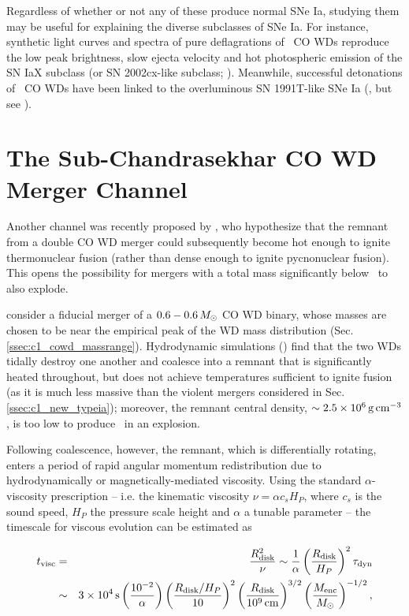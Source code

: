 Regardless of whether or not any of these produce normal SNe Ia, studying them may be useful for explaining the diverse subclasses of SNe Ia.  For instance, synthetic light curves and spectra of pure deflagrations of \Mch\ CO WDs \citep{phil+07, krom+13, fink+14} reproduce the low peak brightness, slow ejecta velocity and hot photospheric emission of the SN IaX subclass (or SN 2002cx-like subclass; \citealt{li+02, fole+13}).  Meanwhile, successful detonations of \Mch\ CO WDs have been linked to the overluminous SN 1991T-like SNe Ia (\citealt{fishj15}, but see \citealt{seit+16}).

\section{The Sub-Chandrasekhar CO WD Merger Channel}
\label{sec:c1_vkchannel}

Another channel was recently proposed by \citeal{vkercj10}, who hypothesize that the remnant from a double CO WD merger could subsequently become hot enough to ignite thermonuclear fusion (rather than dense enough to ignite pycnonuclear fusion).  This opens the possibility for mergers with a total mass significantly below \Mch\ to also explode.

\citeal{vkercj10} consider a fiducial merger of a $0.6-0.6\,\Msun$ CO WD binary, whose masses are chosen to be near the empirical peak of the WD mass distribution (Sec. \ref{ssec:c1_cowd_massrange}).  Hydrodynamic simulations (\citeal{loreig09}) find that the two WDs tidally destroy one another and coalesce into a remnant that is significantly heated throughout, but does not achieve temperatures sufficient to ignite fusion (as it is much less massive than the violent mergers considered in Sec. \ref{ssec:c1_new_typeia}); moreover, the remnant central density, $\sim2.5\times10^6\,\gcc$, is too low to produce \Ni\ in an explosion.  

Following coalescence, however, the remnant, which is differentially rotating, enters a period of rapid angular momentum redistribution due to hydrodynamically or magnetically-mediated viscosity.  Using the standard $\alpha$-viscosity prescription \citep{shaks73} -- i.e. the kinematic viscosity $\nu = \alpha c_s H_P$, where $c_s$ is the sound speed, $H_P$ the pressure scale height and $\alpha$ a tunable parameter -- the timescale for viscous evolution can be estimated as \citep{shen+12}

\begin{eqnarray}
t_\mrm{visc} &=& \frac{R_\mrm{disk}^2}{\nu} \sim \frac{1}{\alpha}\left(\frac{R_\mrm{disk}}{H_P}\right)^2\taudyn \nonumber \\
			&\sim& 3\times10^4\,\mrm{s}\left(\frac{10^{-2}}{\alpha}\right)\left(\frac{R_\mrm{disk}/H_P}{10}\right)^2\left(\frac{R_\mrm{disk}}{10^9\,\mrm{cm}}\right)^{3/2}\left(\frac{M_\mrm{enc}}{\Msun}\right)^{-1/2},
\end{eqnarray}

